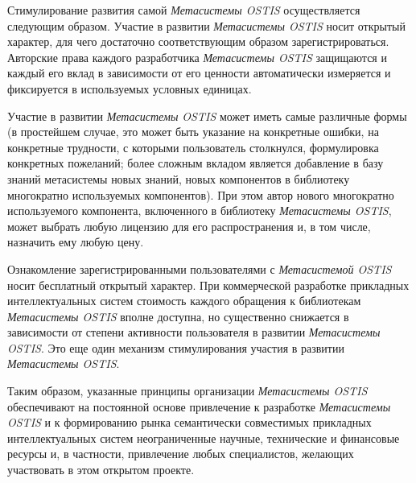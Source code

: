 \begin{SCn}
\begin{scnsubstruct}
{\begin{scnitemize}
			\item Стимулирование развития самой \textit{Метасистемы OSTIS} осуществляется следующим образом. Участие в развитии \textit{Метасистемы OSTIS} носит открытый характер, для чего достаточно соответствующим образом зарегистрироваться. Авторские права каждого разработчика \textit{Метасистемы OSTIS} защищаются и каждый его вклад в зависимости от его ценности автоматически измеряется и фиксируется в используемых условных единицах.\item Участие в развитии \textit{Метасистемы OSTIS} может иметь самые различные формы (в простейшем случае, это может быть указание на конкретные ошибки, на конкретные трудности, с которыми пользователь столкнулся, формулировка конкретных пожеланий; более сложным вкладом является добавление в базу знаний метасистемы новых знаний, новых компонентов в библиотеку многократно используемых компонентов). При этом автор нового многократно используемого компонента, включенного в библиотеку \textit{Метасистемы OSTIS}, может выбрать любую лицензию для его распространения и, в том числе, назначить ему любую цену.
			\item Ознакомление зарегистрированными пользователями с \textit{Метасистемой OSTIS} носит бесплатный открытый характер. При коммерческой разработке прикладных интеллектуальных систем стоимость каждого обращения к библиотекам \textit{Метасистемы OSTIS} вполне доступна, но существенно снижается в зависимости от степени активности пользователя в развитии \textit{Метасистемы OSTIS}. Это еще один механизм стимулирования участия в развитии \textit{Метасистемы OSTIS}.
		\end{scnitemize}
		Таким образом, указанные принципы организации \textit{Метасистемы OSTIS} обеспечивают на постоянной основе привлечение к разработке \textit{Метасистемы OSTIS} и к формированию рынка семантически совместимых прикладных интеллектуальных систем неограниченные научные, технические и финансовые ресурсы и, в частности, привлечение любых специалистов, желающих участвовать в этом открытом проекте.}
	

\end{scnsubstruct}
\end{SCn}
